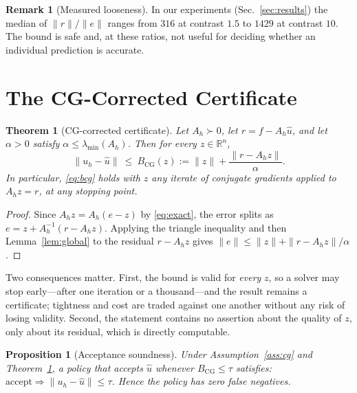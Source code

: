 \documentclass[journal]{IEEEtran}
\theoremstyle{plain}
\newtheorem{theorem}{Theorem}
\newtheorem{proposition}{Proposition}
\theoremstyle{definition}
\newtheorem{remark}{Remark}
\begin{document}
\begin{remark}[Measured looseness]
In our experiments (Sec.~\ref{sec:results}) the median of $\|r\|/\|e\|$ ranges from
$316$ at contrast $1.5$ to $1429$ at contrast $10$. The bound is safe and, at these
ratios, not useful for deciding whether an individual prediction is accurate.
\end{remark}

\section{The CG-Corrected Certificate}
\begin{theorem}[CG-corrected certificate]\label{thm:cg}
Let $A_h\succ0$, let $r=f-A_h\hat u$, and let $\alpha>0$ satisfy
$\alpha\le\lambda_{\min}(A_h)$. Then for every $z\in\mathbb{R}^n$,
\begin{equation}
\|u_h-\hat u\|\ \le\ B_{\mathrm{CG}}(z):=\|z\|+\frac{\|r-A_hz\|}{\alpha}.
\label{eq:bcg}
\end{equation}
In particular, \eqref{eq:bcg} holds with $z$ any iterate of conjugate gradients applied
to $A_hz=r$, at any stopping point.
\end{theorem}
\begin{proof}
Since $A_hz=A_h(e-z)$ by \eqref{eq:exact}, the error splits as
$e=z+A_h^{-1}(r-A_hz)$. Applying the triangle inequality and then
Lemma~\ref{lem:global} to the residual $r-A_hz$ gives
$\|e\|\le\|z\|+\|r-A_hz\|/\alpha$.
\end{proof}

Two consequences matter. First, the bound is valid for \emph{every} $z$, so a solver may
stop early---after one iteration or a thousand---and the result remains a certificate;
tightness and cost are traded against one another without any risk of losing validity.
Second, the statement contains no assertion about the quality of $z$, only about its
residual, which is directly computable.

\begin{proposition}[Acceptance soundness]\label{prop:sound}
Under Assumption~\ref{ass:cg} and Theorem~\ref{thm:cg}, a policy that accepts $\hat u$
whenever $B_{\mathrm{CG}}\le\tau$ satisfies: $\mathrm{accept}\Rightarrow\|u_h-\hat u\|\le\tau$.
Hence the policy has zero false negatives.
\end{proposition}
\end{document}
